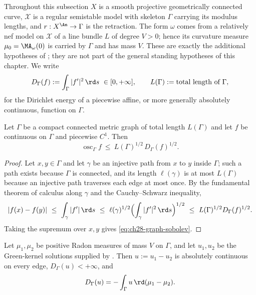 Throughout this subsection $X$ is a smooth projective geometrically
connected curve, $\mathcal X$ is a regular semistable model with skeleton
$\Gamma$ carrying its modulus lengths, and $r:X^{\An}\to\Gamma$ is the
retraction.  The form $\omega$ comes from a relatively nef model on
$\mathcal X$ of a line bundle $L$ of degree $V>0$; hence its curvature
measure $\mu_0=\MA_\omega(0)$ is carried by $\Gamma$ and has mass $V$.
These are exactly the additional hypotheses of
; they are not part of the
general standing hypotheses of this chapter.  We write
\begin{equation}
\label{eq:ch28-dirichlet-form}
 D_\Gamma(f):=\int_\Gamma|f'|^2\,\rd s\ \in[0,+\infty],
 \qquad
 L(\Gamma):=\text{total length of }\Gamma ,
\end{equation}
for the Dirichlet energy of a piecewise affine, or more generally absolutely
continuous, function on $\Gamma$.

\begin{lemma}
\label{lem:ch28-graph-sobolev}
Let $\Gamma$ be a compact connected metric graph of total length
$L(\Gamma)$ and let $f$ be continuous on $\Gamma$ and piecewise
$C^1$.  Then
\begin{equation}
\label{eq:ch28-graph-sobolev}
 \operatorname{osc}_\Gamma f
 \ \leq\ L(\Gamma)^{1/2}\,D_\Gamma(f)^{1/2}.
\end{equation}
\end{lemma}

\begin{proof}
Let $x,y\in\Gamma$ and let $\gamma$ be an injective path from $x$ to
$y$ inside $\Gamma$; such a path exists because $\Gamma$ is connected,
and its length $\ell(\gamma)$ is at most $L(\Gamma)$ because an
injective path traverses each edge at most once.  By the fundamental theorem
of calculus along $\gamma$ and the Cauchy--Schwarz inequality,
\[
 |f(x)-f(y)|
 \ \leq\ \int_\gamma|f'|\,\rd s
 \ \leq\ \ell(\gamma)^{1/2}
   \Bigl(\int_\gamma|f'|^2\,\rd s\Bigr)^{1/2}
 \ \leq\ L(\Gamma)^{1/2}D_\Gamma(f)^{1/2}.
\]
Taking the supremum over $x,y$ gives \eqref{eq:ch28-graph-sobolev}.
\end{proof}

\begin{lemma}
\label{lem:ch28-green-dirichlet}
Let $\mu_1,\mu_2$ be positive Radon measures of mass $V$ on $\Gamma$, and
let $u_1,u_2$ be the Green-kernel solutions supplied by
.  Then $u:=u_1-u_2$ is absolutely continuous
on every edge, $D_\Gamma(u)<+\infty$, and
\begin{equation}
\label{eq:ch28-green-dirichlet}
 D_\Gamma(u)=-\int_\Gamma u\,\rd(\mu_1-\mu_2).
\end{equation}
\end{lemma}

